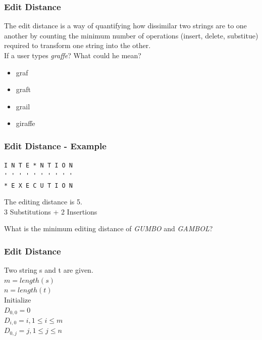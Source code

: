 \begin{frame}[fragile]
\frametitle{Edit Distance}
The edit distance is a way of quantifying how dissimilar two strings are to one another by counting the minimum number of operations (insert, delete, substitue) required to transform one string into the other.\\
\vspace{3mm}
If a user types \emph{graffe}? What could he mean?
\begin{itemize}
\item graf
\item graft
\item grail
\item giraffe
\end{itemize}

\end{frame}

\begin{frame}[fragile]
\frametitle{Edit Distance - Example}
\verb|I N T E * N T I O N|\\
\verb|' ' ' ' ' ' ' ' ' '|\\
\verb|* E X E C U T I O N|\\
 
\vspace{3mm}

The editing distance is 5.\\
3 Substitutions + 2 Insertions\\

\vspace{3mm}

\begin{exercise}
What is the minimum editing distance of \emph{GUMBO} and \emph{GAMBOL}?
\end{exercise}

\end{frame}

\begin{frame}[fragile]
\frametitle{Edit Distance}
Two string s and t are given.\\
$m = length(s)$\\
$n = length(t)$\\
\vspace{3mm}
Initialize\\
$D_{0,0} = 0$\\
$D_{i,0} = i, 1 \leq i \leq m$\\
$D_{0,j} = j, 1 \leq j \leq n$
\end{frame}

